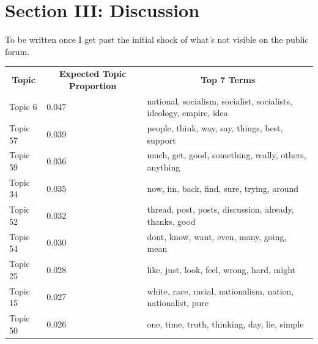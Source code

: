 \documentclass[12pt]{paper}
\begin{document}
\section{Section III: Discussion}
To be written once I get past the initial shock of what's not visible on the public forum.









\begin{table}[H]
	\begin{adjustbox}{width=1\textwidth}
\begin{tabular}{lll}
	\multicolumn{1}{c}{\textbf{Topic}} & \multicolumn{1}{c}{\textbf{Expected Topic Proportion}} & \multicolumn{1}{c}{\textbf{Top 7 Terms}}                            \\
	Topic 6                            & 0.047                                                  & national, socialism, socialist, socialists, ideology, empire, idea  \\
	Topic 57                           & 0.039                                                  & people, think, way, say, things, best, support                      \\
	Topic 59                           & 0.036                                                  & much, get, good, something, really, others, anything                \\
	Topic 34                           & 0.035                                                  & now, im, back, find, sure, trying, around                           \\
	Topic 52                           & 0.032                                                  & thread, post, posts, discussion, already, thanks, good              \\
	Topic 54                           & 0.030                                                  & dont, know, want, even, many, going, mean                           \\
	Topic 25                           & 0.028                                                  & like, just, look, feel, wrong, hard, might                          \\
	Topic 15                           & 0.027                                                  & white, race, racial, nationalism, nation, nationalist, pure         \\
	Topic 50                           & 0.026                                                  & one, time, truth, thinking, day, lie, simple                        \\

\end{tabular}
\end{adjustbox}
\end{table}
\end{document}
